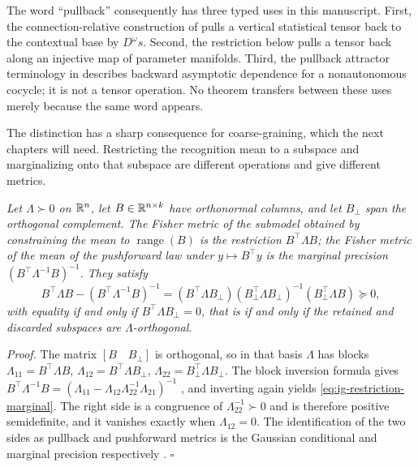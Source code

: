 The word ``pullback'' consequently has three typed uses in this manuscript.
First, the connection-relative construction of
 pulls a vertical statistical tensor back to the
contextual base by $D^{\omega}s$. Second, the restriction below pulls a tensor
back along an injective map of parameter manifolds. Third, the pullback
attractor terminology in  describes backward
asymptotic dependence for a nonautonomous cocycle; it is not a tensor
operation. No theorem transfers between these uses merely because the same
word appears. 

The distinction has a sharp consequence for coarse-graining, which the next chapters will need. Restricting the recognition mean to a subspace and marginalizing onto that subspace are different operations and give different metrics.

\medskip
{}
\emph{Let $\Lambda\succ0$ on $\mathbb R^{n}$, let $B\in\mathbb R^{n\times k}$ have orthonormal columns, and let $B_\perp$ span the orthogonal complement. The Fisher metric of the submodel obtained by constraining the mean to $\operatorname{range}(B)$ is the restriction $B^\top\Lambda B$; the Fisher metric of the mean of the pushforward law under $y\mapsto B^\top y$ is the marginal precision $\left(B^\top\Lambda^{-1}B\right)^{-1}$. They satisfy}
\begin{equation}
B^\top\Lambda B-\left(B^\top\Lambda^{-1}B\right)^{-1}
=\left(B^\top\Lambda B_\perp\right)\left(B_\perp^\top\Lambda B_\perp\right)^{-1}\left(B_\perp^\top\Lambda B\right)
\succeq 0,
\label{eq:ig-restriction-marginal}
\end{equation}
\emph{with equality if and only if $B^\top\Lambda B_\perp=0$, that is if and only if the retained and discarded subspaces are $\Lambda$-orthogonal.}

\noindent\emph{Proof.} The matrix $\left[B\quad B_\perp\right]$ is orthogonal, so in that basis $\Lambda$ has blocks $\Lambda_{11}=B^\top\Lambda B$, $\Lambda_{12}=B^\top\Lambda B_\perp$, $\Lambda_{22}=B_\perp^\top\Lambda B_\perp$. The block inversion formula gives $B^\top\Lambda^{-1}B=\left(\Lambda_{11}-\Lambda_{12}\Lambda_{22}^{-1}\Lambda_{21}\right)^{-1}$ \citep{HornJohnson2013}, and inverting again yields \eqref{eq:ig-restriction-marginal}. The right side is a congruence of $\Lambda_{22}^{-1}\succ0$ and is therefore positive semidefinite, and it vanishes exactly when $\Lambda_{12}=0$. The identification of the two sides as pullback and pushforward metrics is the Gaussian conditional and marginal precision respectively \citep{Lauritzen1996}. \hfill$\square$

